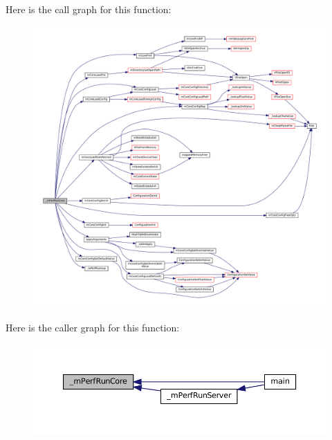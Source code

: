 Here is the call graph for this function\+:
\nopagebreak
\begin{figure}[H]
\begin{center}
\leavevmode
\includegraphics[width=350pt]{perf-main_8c_aa853b44038d99a0c66c0961c5c1b0d66_cgraph}
\end{center}
\end{figure}
Here is the caller graph for this function\+:
\nopagebreak
\begin{figure}[H]
\begin{center}
\leavevmode
\includegraphics[width=350pt]{perf-main_8c_aa853b44038d99a0c66c0961c5c1b0d66_icgraph}
\end{center}
\end{figure}
\mbox{\label{perf-main_8c_af6104bb4f19919428b0781d4c2e09e1d}} 
